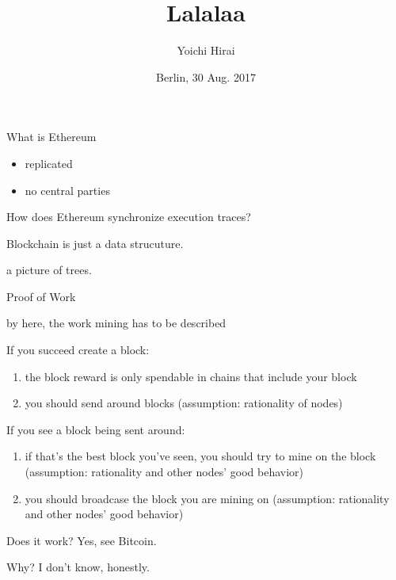 \documentclass{beamer}
\title{Lalalaa}
\author{Yoichi Hirai}
\date{Berlin, 30 Aug. 2017}
\begin{document}
\begin{frame}
\titlepage
\end{frame}

\begin{frame}{What is Ethereum}

\begin{itemize}
\item replicated
\item no central parties
\end{itemize}

How does Ethereum synchronize execution traces?
\end{frame}

\begin{frame}{Blockchain}
is just a data strucuture.

a picture of trees.
\end{frame}

\begin{frame}{Proof of Work}

\alert{by here, the work mining has to be described}

If you succeed create a block:
\begin{enumerate}
\item the block reward is only spendable in chains that include your block
\item you should send around blocks (assumption: rationality of nodes)
\end{enumerate}

If you see a block being sent around:
\begin{enumerate}
\item if that's the best block you've seen, you should try to mine on the block (assumption: rationality and other nodes' good behavior)
\item you should broadcase the block you are mining on (assumption: rationality and other nodes' good behavior)
\end{enumerate}

Does it work?  Yes, see Bitcoin.

Why?  I don't know, honestly.
\end{frame}
\end{document}

